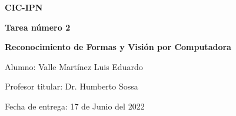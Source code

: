 \begin{center}
	\vspace*{1cm}
	
	{\fontsize{12}{14} \textbf{CIC-IPN}}
	
	\vspace{0.2cm}
	
	{\fontsize{12}{14} \textbf{Tarea número 2}}
	
	\vspace{0.2cm}
	
	{\fontsize{14}{16} \textbf{Reconocimiento de Formas y Visión por Computadora}}
	
	\vspace{0.1cm}
	
	Alumno: Valle Martínez Luis Eduardo
	
	\vspace{0.1cm}
	
	Profesor titular: Dr. Humberto Sossa
	
	\vspace{0.1cm}
	
	Fecha de entrega: 17 de Junio del 2022
	
\end{center}